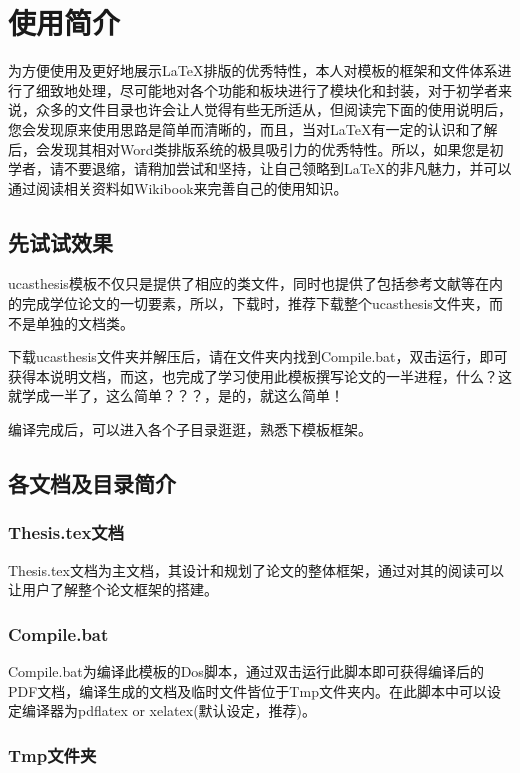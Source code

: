 
\chapter{使用简介}
\label{chap:guide}

为方便使用及更好地展示\LaTeX{}排版的优秀特性，本人对模板的框架和文件体系进行了细致地处理，尽可能地对各个功能和板块进行了模块化和封装，对于初学者来说，众多的文件目录也许会让人觉得有些无所适从，但阅读完下面的使用说明后，您会发现原来使用思路是简单而清晰的，而且，当对\LaTeX{}有一定的认识和了解后，会发现其相对Word类排版系统的极具吸引力的优秀特性。所以，如果您是初学者，请不要退缩，请稍加尝试和坚持，让自己领略到\LaTeX{}的非凡魅力，并可以通过阅读相关资料如Wikibook\citep{wikibook2014latex}来完善自己的使用知识。

\section{先试试效果}

ucasthesis模板不仅只是提供了相应的类文件，同时也提供了包括参考文献等在内的完成学位论文的一切要素，所以，下载时，推荐下载整个ucasthesis文件夹，而不是单独的文档类。

下载ucasthesis文件夹并解压后，请在文件夹内找到Compile.bat，双击运行，即可获得本说明文档，而这，也完成了学习使用此模板撰写论文的一半进程，什么？这就学成一半了，这么简单？？？，是的，就这么简单！

编译完成后，可以进入各个子目录逛逛，熟悉下模板框架。

\section{各文档及目录简介}

\subsection{Thesis.tex文档 }

Thesis.tex文档为主文档，其设计和规划了论文的整体框架，通过对其的阅读可以让用户了解整个论文框架的搭建。

\subsection{Compile.bat}

Compile.bat为编译此模板的Dos脚本，通过双击运行此脚本即可获得编译后的PDF文档，编译生成的文档及临时文件皆位于Tmp文件夹内。在此脚本中可以设定编译器为pdflatex or xelatex(默认设定，推荐)。

\subsection{Tmp文件夹}

